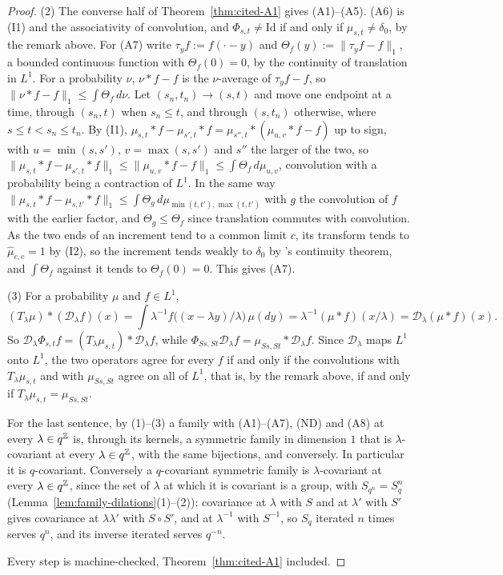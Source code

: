 \begin{proof}
(2) The converse half of Theorem~\ref{thm:cited-A1} gives (A1)--(A5). (A6) is (I1) and the
associativity of convolution, and $\Phi_{s,t} \ne \mathrm{Id}$ if and only if
$\mu_{s,t} \ne \delta_0$, by the remark above. For (A7) write $\tau_yf := f(\cdot - y)$ and
$\Theta_f(y) := \|\tau_yf - f\|_1$, a bounded continuous function with $\Theta_f(0) = 0$, by the
continuity of translation in $L^1$. For a probability $\nu$, $\nu * f - f$ is the
$\nu$-average of $\tau_yf - f$, so $\|\nu * f - f\|_1 \le \int\Theta_f\,d\nu$. Let
$(s_n,t_n) \to (s,t)$ and move one endpoint at a time,
through $(s_n, t)$ when $s_n \le t$, and through $(s, t_n)$ otherwise, where
$s \le t < s_n \le t_n$. By (I1),
$\mu_{s,t} * f - \mu_{s',t} * f = \mu_{s'',t} * (\mu_{u,v} * f - f)$ up to sign, with
$u = \min(s, s')$, $v = \max(s, s')$ and $s''$ the larger of the two, so
$\|\mu_{s,t} * f - \mu_{s',t} * f\|_1 \le \|\mu_{u,v} * f - f\|_1 \le \int\Theta_f\,d\mu_{u,v}$,
convolution with a probability being a contraction of $L^1$. In the same way
$\|\mu_{s,t} * f - \mu_{s,t'} * f\|_1 \le \int\Theta_g\,d\mu_{\min(t,t'),\max(t,t')}$ with $g$ the
convolution of $f$ with the earlier factor, and $\Theta_g \le \Theta_f$ since translation commutes
with convolution. As the two ends of an increment tend to a common limit $c$, its transform tends
to $\widehat\mu_{c,c} = 1$ by (I2), so the increment tends weakly to $\delta_0$ by \Levy's
continuity theorem, and $\int\Theta_f$ against it tends to $\Theta_f(0) = 0$. This gives (A7).

(3) For a probability $\mu$ and $f \in L^1$,
\[
  (T_\lambda\mu) * (\mathcal{D}_\lambda f)(x) = \int\lambda^{-1}f\bigl((x - \lambda y)/\lambda\bigr)\,\mu(dy)
  = \lambda^{-1}(\mu * f)(x/\lambda) = \mathcal{D}_\lambda(\mu * f)(x) .
\]
So $\mathcal{D}_\lambda\Phi_{s,t}f = (T_\lambda\mu_{s,t}) * \mathcal{D}_\lambda f$, while
$\Phi_{Ss,St}\mathcal{D}_\lambda f = \mu_{Ss,St} * \mathcal{D}_\lambda f$. Since
$\mathcal{D}_\lambda$ maps $L^1$ onto $L^1$, the two operators agree for every $f$ if and only if
the convolutions with $T_\lambda\mu_{s,t}$ and with $\mu_{Ss,St}$ agree on all of $L^1$, that is,
by the remark above, if and only if $T_\lambda\mu_{s,t} = \mu_{Ss,St}$.

For the last sentence, by (1)--(3) a family with (A1)--(A7), (ND) and (A8) at every
$\lambda \in q^{\mathbb{Z}}$ is, through its kernels, a symmetric family in dimension $1$ that is
$\lambda$-covariant at every $\lambda \in q^{\mathbb{Z}}$, with the same bijections, and conversely. In
particular it is $q$-covariant. Conversely a $q$-covariant symmetric family is
$\lambda$-covariant at every $\lambda \in q^{\mathbb{Z}}$, since the set of $\lambda$ at which it is
covariant is a group, with $S_{q^n} = S_q^n$ (Lemma~\ref{lem:family-dilations}(1)--(2)):
covariance at $\lambda$ with $S$ and at $\lambda'$ with $S'$ gives covariance at $\lambda\lambda'$
with $S \circ S'$, and at $\lambda^{-1}$ with $S^{-1}$, so $S_q$ iterated $n$ times serves $q^n$,
and its inverse iterated serves $q^{-n}$.

Every step is machine-checked, Theorem~\ref{thm:cited-A1} included.
\end{proof}

